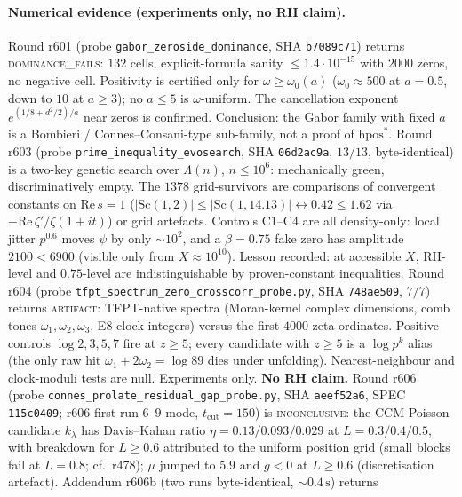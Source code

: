\documentclass[11pt]{article}
\theoremstyle{definition}
\theoremstyle{remark}
\begin{document}
\paragraph{Numerical evidence (experiments only, no RH claim).}
Round r601 (probe \texttt{gabor\_zeroside\_dominance}, SHA
\texttt{b7089c71}) returns \textsc{dominance\_fails}: $132$ cells, explicit-formula
sanity $\le 1.4\cdot 10^{-15}$ with $2000$ zeros, no negative cell.
Positivity is certified only for $\omega\ge\omega_0(a)$
($\omega_0\approx 500$ at $a=0.5$, down to $10$ at $a\ge 3$); no $a\le 5$
is $\omega$-uniform.  The cancellation exponent
$e^{(1/8+d^2/2)/a}$ near zeros is confirmed.  Conclusion: the Gabor family
with fixed $a$ is a Bombieri / Connes--Consani-type sub-family, not a
proof of $\mathrm{hpos}^*$.
Round r603 (probe \texttt{prime\_inequality\_evosearch}, SHA
\texttt{06d2ac9a}, $13/13$, byte-identical) is a two-key genetic search
over $\Lambda(n)$, $n\le 10^6$: mechanically green, discriminatively
empty.  The $1378$ grid-survivors are comparisons of convergent constants
on $\mathrm{Re}\,s=1$
($\lvert\mathrm{Sc}(1,2)\rvert\le\lvert\mathrm{Sc}(1,14.13)\rvert
\leftrightarrow 0.42\le 1.62$ via $-\mathrm{Re}\,\zeta'/\zeta(1+it)$)
or grid artefacts.  Controls C1--C4 are all density-only: local jitter
$p^{0.6}$ moves $\psi$ by only $\sim 10^2$, and a $\beta=0.75$ fake zero
has amplitude $2100<6900$ (visible only from $X\approx 10^{10}$).
Lesson recorded: at accessible $X$, RH-level and $0.75$-level are
indistinguishable by proven-constant inequalities.
Round r604 (probe \texttt{tfpt\_spectrum\_zero\_crosscorr\_probe.py}, SHA
\texttt{748ae509}, $7/7$) returns \textsc{artifact}: TFPT-native spectra
(Moran-kernel complex dimensions, comb tones $\omega_1,\omega_2,\omega_3$,
E8-clock integers) versus the first $4000$ zeta ordinates.  Positive
controls $\log 2,3,5,7$ fire at $z\ge 5$; every candidate with $z\ge 5$
is a $\log p^k$ alias (the only raw hit $\omega_1+2\omega_2=\log 89$ dies
under unfolding).  Nearest-neighbour and clock-moduli tests are null.
Experiments only.  \textbf{No RH claim.}
Round r606 (probe \texttt{connes\_prolate\_residual\_gap\_probe.py},
SHA \texttt{aeef52a6}, SPEC \texttt{115c0409}; r606 first-run
$6$--$9$ mode, $t_{\mathrm{cut}}=150$) is
\textsc{inconclusive}: the CCM Poisson candidate $k_\lambda$ has
Davis--Kahan ratio $\eta=0.13/0.093/0.029$ at $L=0.3/0.4/0.5$, with
breakdown for $L\ge 0.6$ attributed to the uniform position grid
(small blocks fail at $L=0.8$; cf.\ r478); $\mu$ jumped to $5.9$
and $g<0$ at $L\ge 0.6$ (discretisation artefact).  Addendum r606b
(two runs byte-identical, $\sim 0.4\,\mathrm{s}$) returns
\end{document}
